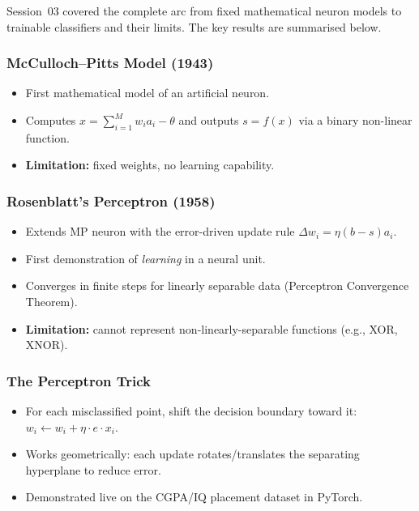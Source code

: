 \documentclass[12pt,a4paper]{article}
\begin{document}
Session~03 covered the complete arc from fixed mathematical neuron
models to trainable classifiers and their limits.
The key results are summarised below.

\subsubsection*{McCulloch--Pitts Model (1943)}
\begin{itemize}
  \item First mathematical model of an artificial neuron.
  \item Computes $x = \sum_{i=1}^{M} w_i a_i - \theta$ and outputs
        $s = f(x)$ via a binary non-linear function.
  \item \textbf{Limitation:} fixed weights, no learning capability.
\end{itemize}

\subsubsection*{Rosenblatt's Perceptron (1958)}
\begin{itemize}
  \item Extends MP neuron with the error-driven update rule
        $\Delta w_i = \eta(b - s)a_i$.
  \item First demonstration of \emph{learning} in a neural unit.
  \item Converges in finite steps for linearly separable data
        (Perceptron Convergence Theorem).
  \item \textbf{Limitation:} cannot represent non-linearly-separable
        functions (e.g., XOR, XNOR).
\end{itemize}

\subsubsection*{The Perceptron Trick}
\begin{itemize}
  \item For each misclassified point, shift the decision boundary
        toward it: $w_i \leftarrow w_i + \eta \cdot e \cdot x_i$.
  \item Works geometrically: each update rotates/translates the
        separating hyperplane to reduce error.
  \item Demonstrated live on the CGPA/IQ placement dataset in PyTorch.
\end{itemize}
\end{document}
